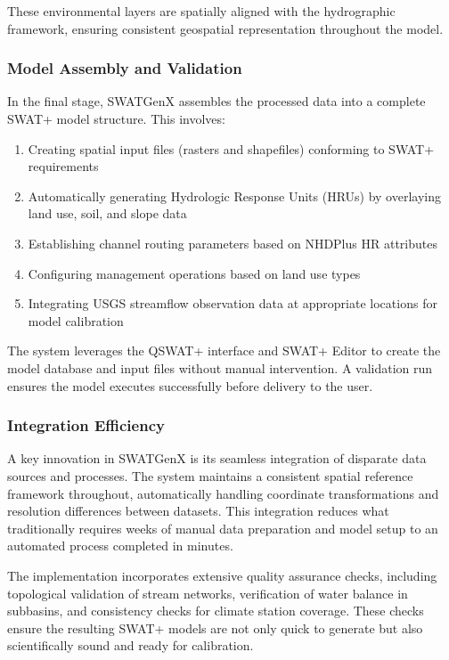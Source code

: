 \documentclass[final,3p,times]{elsarticle}
\begin{document}
These environmental layers are spatially aligned with the hydrographic framework, ensuring consistent geospatial representation throughout the model.

\subsubsection{Model Assembly and Validation}
In the final stage, SWATGenX assembles the processed data into a complete SWAT+ model structure. This involves:

\begin{enumerate}
    \item Creating spatial input files (rasters and shapefiles) conforming to SWAT+ requirements
    \item Automatically generating Hydrologic Response Units (HRUs) by overlaying land use, soil, and slope data
    \item Establishing channel routing parameters based on NHDPlus HR attributes
    \item Configuring management operations based on land use types
    \item Integrating USGS streamflow observation data at appropriate locations for model calibration
\end{enumerate}

The system leverages the QSWAT+ interface and SWAT+ Editor to create the model database and input files without manual intervention. A validation run ensures the model executes successfully before delivery to the user.

\subsubsection{Integration Efficiency}
A key innovation in SWATGenX is its seamless integration of disparate data sources and processes. The system maintains a consistent spatial reference framework throughout, automatically handling coordinate transformations and resolution differences between datasets. This integration reduces what traditionally requires weeks of manual data preparation and model setup to an automated process completed in minutes.

The implementation incorporates extensive quality assurance checks, including topological validation of stream networks, verification of water balance in subbasins, and consistency checks for climate station coverage. These checks ensure the resulting SWAT+ models are not only quick to generate but also scientifically sound and ready for calibration.
\end{document}
